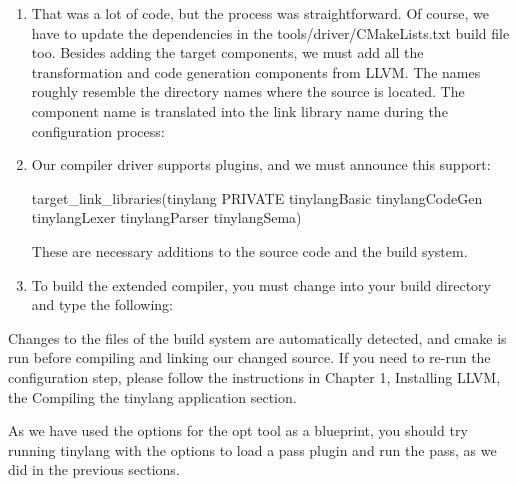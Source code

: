 \begin{enumerate}
\begin{cpp}
    MPM.run(*M, MAM);
    CodeGenPM.run(*M);
    Out->keep();
    return true;
}
\end{cpp}

\item
That was a lot of code, but the process was straightforward. Of course, we have to update the dependencies in the tools/driver/CMakeLists.txt build file too. Besides adding the target components, we must add all the transformation and code generation components from LLVM. The names roughly resemble the directory names where the source is located. The component name is translated into the link library name during the configuration process:


\item
Our compiler driver supports plugins, and we must announce this support:

\begin{cmake}
target_link_libraries(tinylang
    PRIVATE tinylangBasic tinylangCodeGen
    tinylangLexer tinylangParser tinylangSema)
\end{cmake}

These are necessary additions to the source code and the build system.

\item
To build the extended compiler, you must change into your build directory and type the following:


\end{enumerate}

Changes to the files of the build system are automatically detected, and cmake is run before compiling and linking our changed source. If you need to re-run the configuration step, please follow the instructions in Chapter 1, Installing LLVM, the Compiling the tinylang application section.

As we have used the options for the opt tool as a blueprint, you should try running tinylang with the options to load a pass plugin and run the pass, as we did in the previous sections.

